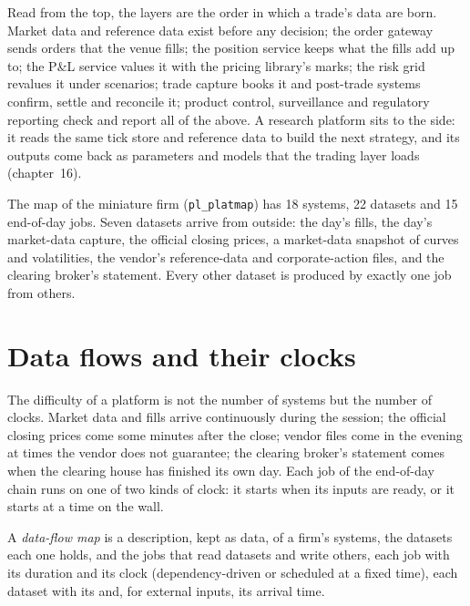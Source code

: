 Read from the top, the layers are the order in which a trade's data are born. Market data and reference data exist before any
decision; the order gateway sends orders that the venue fills; the position service keeps what the fills add up to; the P\&L
service values it with the pricing library's marks; the risk grid revalues it under scenarios; trade capture books it and
post-trade systems confirm, settle and reconcile it; product control, surveillance and regulatory reporting check and report
all of the above. A research platform sits to the side: it reads the same tick store and reference data to build the next
strategy, and its outputs come back as parameters and models that the trading layer loads (chapter~16).

\begin{example}\label{ex:pl:the-platform-map:numbers}
The map of the miniature firm (\texttt{pl\_platmap}) has 18 systems, 22 datasets and 15 end-of-day jobs. Seven datasets
arrive from outside: the day's fills, the day's market-data capture, the official closing prices, a market-data snapshot of
curves and volatilities, the vendor's reference-data and corporate-action files, and the clearing broker's statement. Every
other dataset is produced by exactly one job from others.
\end{example}

\section{Data flows and their clocks}

The difficulty of a platform is not the number of systems but the number of clocks. Market data and fills arrive continuously
during the session; the official closing prices come some minutes after the close; vendor files come in the evening at times
the vendor does not guarantee; the clearing broker's statement comes when the clearing house has finished its own day. Each job
of the end-of-day chain runs on one of two kinds of clock: it starts when its inputs are ready, or it starts at a time on the
wall.

\begin{definition}\label{def:pl:the-platform-map:map}
A \emph{data-flow map} is a description, kept as data, of a firm's systems, the datasets each one holds,
and the jobs that read datasets and write others, each job with its duration and its clock (dependency-driven or scheduled at a
fixed time), each dataset with its  and, for external inputs, its arrival time.
\end{definition}

